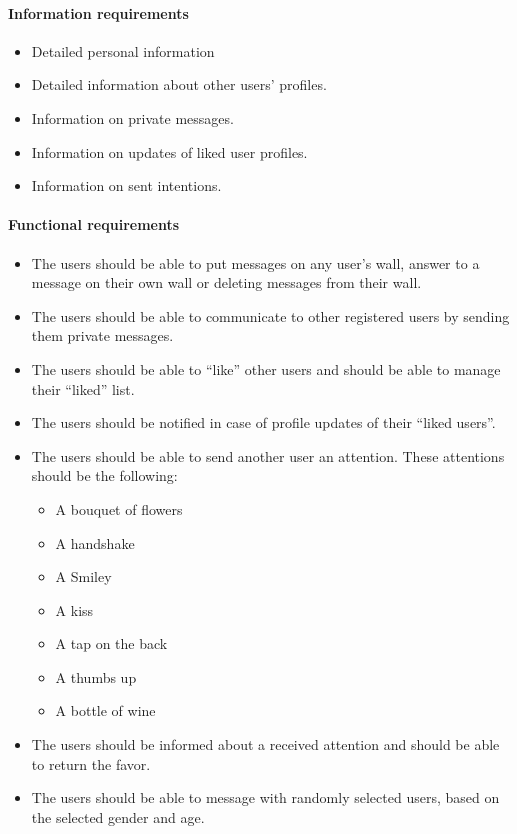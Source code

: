 \documentclass[11pt, a4paper,svglistings,oneside]{book}
\begin{document}
\paragraph{Information requirements}

\begin{itemize}
\item Detailed personal information 
\item Detailed information about other users' profiles.
\item Information on private messages.
\item Information on updates of liked user profiles.
\item Information on sent intentions.
\end{itemize}

\paragraph{Functional requirements}

\begin{itemize}
\item The users should be able to put messages on any user's wall, answer to a message on their own wall or deleting messages from their wall.
\item The users should be able to communicate to other registered users by sending them private messages.
\item The users should be able to ``like'' other users and should be able to manage their ``liked'' list.
\item The users should be notified in case of profile updates of their ``liked users''.
\item The users should be able to send another user an attention. These attentions should be the following:
	\begin{itemize}
	\item A bouquet of flowers
	\item A handshake
	\item A Smiley
	\item A kiss
	\item A tap on the back
	\item A thumbs up
	\item A bottle of wine
	\end{itemize}
\item The users should be informed about a received attention and should be able to return the favor.
\item The users should be able to message with randomly selected users, based on the selected gender and age.
\end{itemize}
\end{document}
